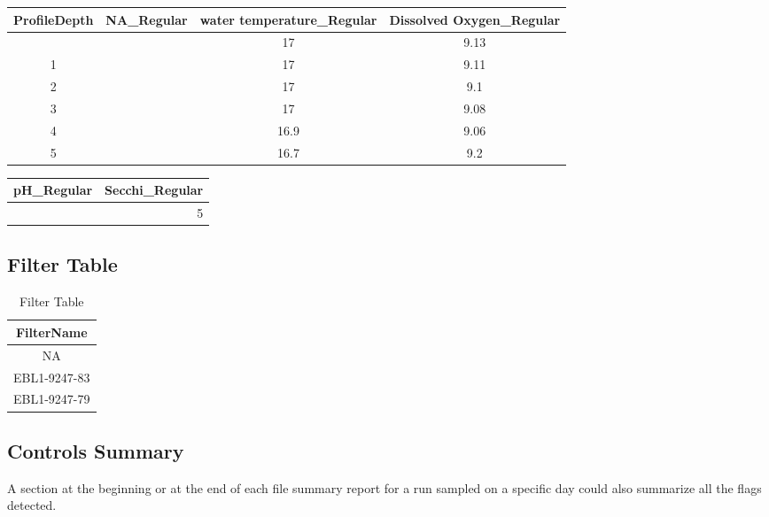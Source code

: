 \documentclass[
  letterpaper,
  DIV=11,
  numbers=noendperiod]{scrartcl}
\begin{document}
\begin{table}

\caption{\label{tbl-results}Results
Table}\begin{minipage}[t]{\linewidth}
\subcaption{\label{tbl-results-1}}

{\centering 

\begin{longtable*}{cccc}
\toprule
ProfileDepth & NA\_Regular & water temperature\_Regular & Dissolved Oxygen\_Regular \\ 
\midrule{} &  & 17 & 9.13 \\ 
1 &  & 17 & 9.11 \\ 
2 &  & 17 & 9.1 \\ 
3 &  & 17 & 9.08 \\ 
4 &  & 16.9 & 9.06 \\ 
5 &  & 16.7 & 9.2 \\ 
\bottomrule
\end{longtable*}

}

\end{minipage}%
\newline
\begin{minipage}[t]{\linewidth}
\subcaption{\label{tbl-results-2}}

{\centering 

\begin{longtable*}{rr}
\toprule
pH\_Regular & Secchi\_Regular \\ 
\midrule{} & 5 \\ 
\bottomrule
\end{longtable*}

}

\end{minipage}%

\end{table}

\hypertarget{filter-table}{%
\subsection{Filter Table}\label{filter-table}}

\hypertarget{tbl-filter}{}
\begin{longtable}{c}
\caption{\label{tbl-filter}Filter Table }\tabularnewline

\toprule
FilterName \\ 
\midrule\addlinespace[2.5pt]
NA \\ 
EBL1-9247-83 \\ 
EBL1-9247-79 \\ 
\bottomrule
\end{longtable}

\hypertarget{controls-summary}{%
\subsection{Controls Summary}\label{controls-summary}}

A section at the beginning or at the end of each file summary report for
a run sampled on a specific day could also summarize all the flags
detected.
\end{document}
